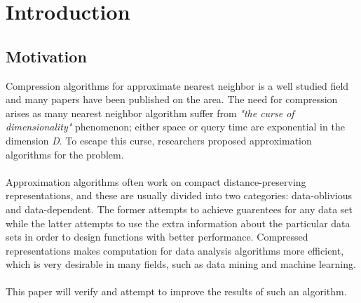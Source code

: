 \section{Introduction}
\label{introduction}
\subsection{Motivation} %
Compression algorithms for approximate nearest neighbor is a well studied field and many papers have been published on the area. The need for compression arises as many nearest neighbor algorithm suffer from \textit{"the curse of dimensionality"} phenomenon; either space or query time are exponential in the dimension \textit{D}. To escape this curse,
researchers proposed approximation algorithms for the problem.\cite{ilya15} 
\\
\\
Approximation algorithms often work on compact distance-preserving representations, and these are usually divided into two categories: data-oblivious and data-dependent. The former attempts to achieve guarentees for any data set while the latter attempts to use the extra information about the particular data sets in order to design functions with better performance. Compressed representations makes computation for data analysis algorithms more efficient, which is very desirable in many fields, such as data mining and machine learning.\cite{stan15}
\\
\\
This paper will verify and attempt to improve the results of such an algorithm. 

